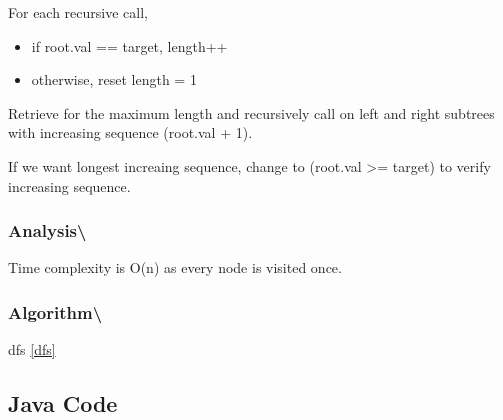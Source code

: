 \documentclass[]{book}
\providecommand{\tightlist}{%
  \setlength{\itemsep}{0pt}\setlength{\parskip}{0pt}}
\begin{document}
For each recursive call,

\begin{itemize}
\tightlist
\item
  if root.val == target, length++
\item
  otherwise, reset length = 1
\end{itemize}

Retrieve for the maximum length and recursively call on left and right subtrees with increasing sequence
(root.val + 1).

If we want longest increaing sequence, change to (root.val \textgreater{}= target) to verify increasing sequence.

\hypertarget{analysis-89}{%
\subsubsection{Analysis\textbackslash{}}\label{analysis-89}}

Time complexity is O(n) as every node is visited once.

\hypertarget{algorithm-90}{%
\subsubsection{Algorithm\textbackslash{}}\label{algorithm-90}}

dfs \ref{dfs}

\hypertarget{java-code-52}{%
\subsection{Java Code}\label{java-code-52}}
\end{document}
